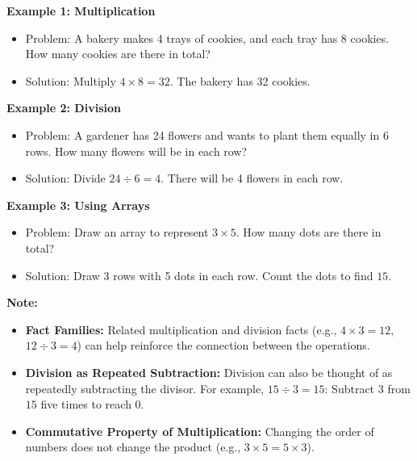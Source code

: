 \documentclass[12pt]{article}
\begin{document}
\begin{tcolorbox}[colframe=black!60, colback=white, 
coltitle=black, colbacktitle=black!15, fonttitle=\bfseries\Large, 
title=Examples, halign title=center, left=10pt, right=10pt, top=10pt, bottom=15pt]
\textbf{Example 1: Multiplication}
\begin{itemize}
    \item Problem: A bakery makes 4 trays of cookies, and each tray has 8 cookies. How many cookies are there in total?
    \item Solution: Multiply \( 4 \times 8 = 32 \). The bakery has 32 cookies.
\end{itemize}

\textbf{Example 2: Division}
\begin{itemize}
    \item Problem: A gardener has 24 flowers and wants to plant them equally in 6 rows. How many flowers will be in each row?
    \item Solution: Divide \( 24 \div 6 = 4 \). There will be 4 flowers in each row.
\end{itemize}

\textbf{Example 3: Using Arrays}
\begin{itemize}
    \item Problem: Draw an array to represent \( 3 \times 5 \). How many dots are there in total?
    \item Solution: Draw 3 rows with 5 dots in each row. Count the dots to find \( 15 \).
\end{itemize}
\end{tcolorbox}

\begin{tcolorbox}[colframe=black!40, colback=gray!5, 
coltitle=black, colbacktitle=black!20, fonttitle=\bfseries\Large, 
title=Additional Notes, halign title=center, left=5pt, right=5pt, top=5pt, bottom=15pt]
\textbf{Note:}
\begin{itemize}
    \item \textbf{Fact Families:} Related multiplication and division facts (e.g., \( 4 \times 3 = 12 \), \( 12 \div 3 = 4 \)) can help reinforce the connection between the operations.
    \item \textbf{Division as Repeated Subtraction:} Division can also be thought of as repeatedly subtracting the divisor. For example, \( 15 \div 3 = 15 \): Subtract \( 3 \) from \( 15 \) five times to reach \( 0 \).
    \item \textbf{Commutative Property of Multiplication:} Changing the order of numbers does not change the product (e.g., \( 3 \times 5 = 5 \times 3 \)).
\end{itemize}
\end{tcolorbox}
\end{document}
